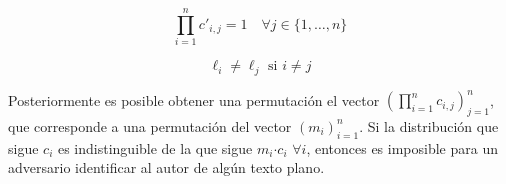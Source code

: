 \[
\prod_{i=1}^{n}c'_{i,j}=1\quad\forall j\in\{1,\ldots,n\}\]


\[
\ell_{i}\neq\ell_{j}\mbox{ si }i\neq j\]


Posteriormente es posible obtener una permutación el vector $(\prod_{i=1}^{n}c{}_{i,j})_{j=1}^{n}$,
que corresponde a una permutación del vector $(m_{i})_{i=1}^{n}$.
Si la distribución que sigue $c_{i}$ es indistinguible de la que
sigue $m_{i}\text{·}c_{i}$ $\forall i$, entonces es imposible para
un adversario identificar al autor de algún texto plano.

